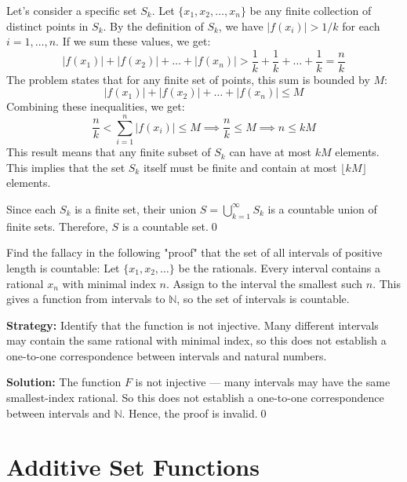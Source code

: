 Let's consider a specific set $S_k$. Let $\{x_1, x_2, \dots, x_n\}$ be any finite collection of distinct points in $S_k$.
By the definition of $S_k$, we have $|f(x_i)| > 1/k$ for each $i=1, \dots, n$.
If we sum these values, we get:
\[ |f(x_1)| + |f(x_2)| + \dots + |f(x_n)| > \frac{1}{k} + \frac{1}{k} + \dots + \frac{1}{k} = \frac{n}{k} \]
The problem states that for any finite set of points, this sum is bounded by $M$:
\[ |f(x_1)| + |f(x_2)| + \dots + |f(x_n)| \le M \]
Combining these inequalities, we get:
\[ \frac{n}{k} < \sum_{i=1}^n |f(x_i)| \le M \implies \frac{n}{k} \le M \implies n \le kM \]
This result means that any finite subset of $S_k$ can have at most $kM$ elements. This implies that the set $S_k$ itself must be finite and contain at most $\lfloor kM \rfloor$ elements.

Since each $S_k$ is a finite set, their union $S = \bigcup_{k=1}^{\infty} S_k$ is a countable union of finite sets. Therefore, $S$ is a countable set.\qed



\begin{problembox}
\begin{problemstatement}
Find the fallacy in the following "proof" that the set of all intervals of positive length is countable:  
Let \( \{x_1, x_2, \ldots\} \) be the rationals. Every interval contains a rational \( x_n \) with minimal index \( n \).  
Assign to the interval the smallest such \( n \). This gives a function from intervals to \( \mathbb{N} \), so the set of intervals is countable.
\end{problemstatement}
\end{problembox}

\noindent\textbf{Strategy:} Identify that the function is not injective. Many different intervals may contain the same rational with minimal index, so this does not establish a one-to-one correspondence between intervals and natural numbers.

\bigskip\noindent\textbf{Solution:}  
The function \( F \) is not injective — many intervals may have the same smallest-index rational.  
So this does not establish a one-to-one correspondence between intervals and \( \mathbb{N} \).  
Hence, the proof is invalid.\qed

\section{Additive Set Functions}

